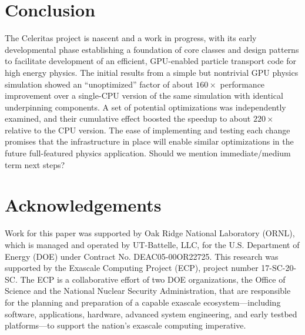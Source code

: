 \documentclass{webofc}
\begin{document}
\section{Conclusion}

The Celeritas project is nascent and a work in progress, with its
early developmental phase establishing a foundation of core classes and
design patterns to facilitate development of an efficient, GPU-enabled particle
transport code for high energy physics. The initial results from a simple but
nontrivial GPU physics simulation showed an ``unoptimized'' factor of about
$160\times$ performance improvement over a single-CPU version of the same
simulation with identical underpinning components. A set of potential
optimizations was independently examined, and their cumulative effect boosted
the speedup to about $220\times$ relative to the CPU version. The ease of
implementing and testing each change promises that the infrastructure in place
will enable similar optimizations in the future full-featured physics
application. {\color{red} Should we mention immediate/medium term next steps?}

\section{Acknowledgements}

Work for this paper was supported by Oak Ridge National Laboratory (ORNL), which is managed and operated by UT-Battelle, LLC, for the U.S. Department of Energy (DOE) under Contract No. DEAC05-00OR22725.
This research was supported by the Exascale Computing
Project (ECP), project number 17-SC-20-SC. The ECP is a collaborative effort of
two DOE organizations, the Office of Science and the National Nuclear Security
Administration, that are responsible for the planning and preparation of a
capable exascale ecosystem---including software, applications, hardware,
advanced system engineering, and early testbed platforms---to support the
nation's exascale computing imperative.


\end{document}
